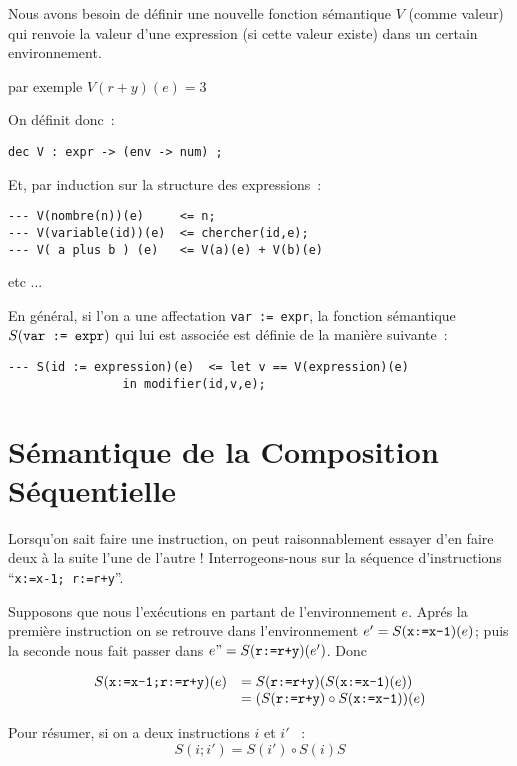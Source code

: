 Nous avons besoin de définir une nouvelle fonction sémantique $V$
(comme valeur) qui renvoie la valeur d'une expression (si cette valeur
existe) dans un certain environnement.

par exemple   $V(r+y)(e) = 3$

On définit donc~:
\begin{verbatim}
dec V : expr -> (env -> num) ;
\end{verbatim}

Et, par induction sur la structure des expressions~:

\begin{verbatim}
--- V(nombre(n))(e) 	<= n;
--- V(variable(id))(e) 	<= chercher(id,e);
--- V( a plus b ) (e)	<= V(a)(e) + V(b)(e)
\end{verbatim}
etc ...


En général, si l'on a une affectation \verb/var := expr/, la fonction
sémantique $S(\mbox{\texttt{var := expr}})$ qui lui est associée est
définie de la manière suivante~:

\begin{verbatim}
--- S(id := expression)(e)  <= let v == V(expression)(e)
				in modifier(id,v,e);
\end{verbatim}


\section{Sémantique de la Composition Séquentielle}

Lorsqu'on sait faire une instruction, on peut raisonnablement essayer d'en faire deux à la suite l'une de l'autre ! Interrogeons-nous sur la séquence d'instructions ``\verb/x:=x-1; r:=r+y/''. 

Supposons que nous l'exécutions en partant de l'environnement
               $e$. Aprés la première instruction on se retrouve dans
               l'environnement $e' = S(\mbox{\texttt{x:=x-1}})(e)$; puis la seconde nous fait
               passer dans $e" = S(\mbox{\texttt{r:=r+y}})(e')$. Donc

$$\begin{array}{rl}
S(\mbox{\tt x:=x-1;r:=r+y})(e) &= S(\mbox{\tt r:=r+y})(S(\mbox{\tt x:=x-1})(e)) \\
&=               (S(\mbox{\tt r:=r+y}) \circ S(\mbox{\tt x:=x-1}))(e)
\end{array}$$

Pour résumer, si on a deux instructions $i$  et $i'$ ~:
$$                         S(i ; i' ) =  S(i' ) \circ S(i)S                         $$


